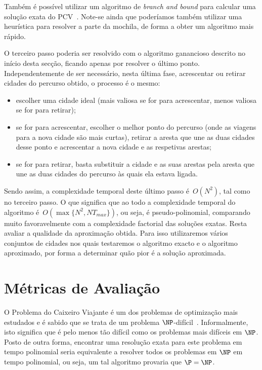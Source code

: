 \documentclass[12pt,a4paper,reqno]{report}
\numberwithin{figure}{section}
\numberwithin{equation}{section}
\numberwithin{figure}{section}
\numberwithin{equation}{section}
\begin{document}
Também é possível utilizar um algoritmo de \emph{branch and bound} para calcular uma solução exata do PCV~\cite{tube_bnb_tsp_1, tube_bnb_tsp_2, Narahari:2000}. Note-se ainda que poderíamos também utilizar uma heurística para resolver a parte da mochila, de forma a obter um algoritmo mais rápido.

O terceiro passo poderia ser resolvido com o algoritmo ganancioso descrito no início desta secção, ficando apenas por resolver o último ponto. Independentemente de ser necessário, nesta última fase, acrescentar ou retirar cidades do percurso obtido, o processo é o mesmo:
\begin{itemize}
	\item escolher uma cidade ideal (mais valiosa se for para acrescentar, menos valiosa se for para retirar);
	\item se for para acrescentar, escolher o melhor ponto do percurso (onde as viagens para a nova cidade são mais curtas), retirar a aresta que une as duas cidades desse ponto e acrescentar a nova cidade e as respetivas arestas;
	\item se for para retirar, basta substituir a cidade e as suas arestas pela aresta que une as duas cidades do percurso às quais ela estava ligada.
\end{itemize}

Sendo assim, a complexidade temporal deste último passo é~$O(N^2)$, tal como no terceiro passo. O que significa que ao todo a complexidade temporal do algoritmo é~$O(\max\{N^2,NT_{max}\})$, ou seja, é pseudo-polinomial, comparando muito favoravelmente com a complexidade factorial das soluções exatas. Resta avaliar a qualidade da aproximação obtida. Para isso utilizaremos vários conjuntos de cidades nos quais testaremos o algoritmo exacto e o algoritmo aproximado, por forma a determinar quão pior é a solução aproximada.

\chapter{Métricas de Avaliação}

O Problema do Caixeiro Viajante é um dos problemas de optimização mais estudados e é sabido que se trata de um problema $\NP$-difícil~\cite{Garey&Johnson:1979, Papadimitriou:1994}. Informalmente, isto significa que é pelo menos tão difícil como os problemas mais difíceis em $\NP$. Posto de outra forma, encontrar uma resolução exata para este problema em tempo polinomial seria equivalente a resolver todos os problemas em $\NP$ em tempo polinomial, ou seja, um tal algoritmo provaria que $\P = \NP$.
\end{document}
